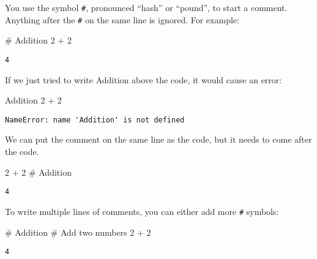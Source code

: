 \documentclass[
  letterpaper,
  DIV=11,
  numbers=noendperiod]{scrreprt}
\newenvironment{Shaded}{\begin{snugshade}}{\end{snugshade}}
\newcommand{\CommentTok}[1]{\textcolor[rgb]{0.37,0.37,0.37}{#1}}
\newcommand{\DecValTok}[1]{\textcolor[rgb]{0.68,0.00,0.00}{#1}}
\newcommand{\NormalTok}[1]{\textcolor[rgb]{0.00,0.23,0.31}{#1}}
\newcommand{\OperatorTok}[1]{\textcolor[rgb]{0.37,0.37,0.37}{#1}}
\begin{document}
You use the symbol \texttt{\#}, pronounced ``hash'' or ``pound'', to
start a comment. Anything after the \texttt{\#} on the same line is
ignored. For example:

\begin{Shaded}
\begin{Highlighting}[]
\CommentTok{\# Addition}
\DecValTok{2} \OperatorTok{+} \DecValTok{2}
\end{Highlighting}
\end{Shaded}

\begin{verbatim}
4
\end{verbatim}

If we just tried to write Addition above the code, it would cause an
error:

\begin{Shaded}
\begin{Highlighting}[]
\NormalTok{Addition}
\DecValTok{2} \OperatorTok{+} \DecValTok{2}
\end{Highlighting}
\end{Shaded}

\begin{verbatim}
NameError: name 'Addition' is not defined
\end{verbatim}

We can put the comment on the same line as the code, but it needs to
come after the code.

\begin{Shaded}
\begin{Highlighting}[]
\DecValTok{2} \OperatorTok{+} \DecValTok{2}  \CommentTok{\# Addition}
\end{Highlighting}
\end{Shaded}

\begin{verbatim}
4
\end{verbatim}

To write multiple lines of comments, you can either add more \texttt{\#}
symbols:

\begin{Shaded}
\begin{Highlighting}[]
\CommentTok{\# Addition}
\CommentTok{\# Add two numbers}
\DecValTok{2} \OperatorTok{+} \DecValTok{2}
\end{Highlighting}
\end{Shaded}

\begin{verbatim}
4
\end{verbatim}
\end{document}
